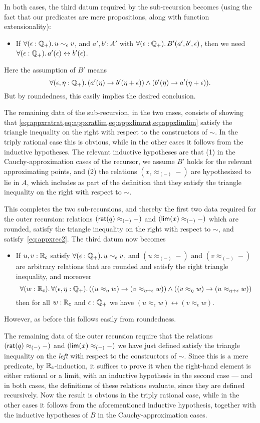 In both cases, the third datum required by the sub-recursion becomes (using the fact that our predicates are mere propositions, along with function extensionality):
\begin{itemize}
\item If $\fall{\epsilon:\Qp} u\sim_\epsilon v$, and $a',b':A'$ with $\fall{\epsilon:\Qp} B'(a',b',\epsilon)$, then we need $\fall{\epsilon:\Qp} a'(\epsilon) \leftrightarrow b'(\epsilon)$.
\end{itemize}
Here the assumption of $B'$ means
\[\fall{\epsilon,\eta:\Qp} (a'(\eta) \to b'(\eta+\epsilon)) \land (b'(\eta) \to a'(\eta+\epsilon)).\]
But by roundedness, this easily implies the desired conclusion.

The remaining data of the sub-recursion, in the two cases, consists of showing that \cref{eq:appxratrat,eq:appxratlim,eq:appxlimrat,eq:appxlimlim} satisfy the triangle inequality on the right with respect to the constructors of $\sim$.
In the triply rational case this is obvious, while in the other cases it follows from the inductive hypotheses.
The relevant inductive hypotheses are that (1) in the Cauchy-approximation cases of the recursor, we assume $B'$ holds for the relevant approximating points, and (2) the relations $(x_\epsilon \approx_{(-)} -)$ are hypothesized to lie in $A$, which includes as part of the definition that they satisfy the triangle inequality on the right with respect to $\sim$.

This completes the two sub-recursions, and thereby the first two data required for the outer recursion: relations $(\mathsf{rat}(q)\approx_{(-)}-)$ and $(\mathsf{lim}(x)\approx_{(-)}-)$ which are rounded, satisfy the triangle inequality on the right with respect to $\sim$, and satisfy~\eqref{eq:appxrec2}.
The third datum now becomes
\begin{itemize}
\item If $u,v:\mathbb{R}_\mathsf{c}$ satisfy $\fall{\epsilon:\Qp} u\sim_\epsilon v$, and $(u\approx_{(-)}-)$ and $(v\approx_{(-)}-)$ are arbitrary relations that are rounded and satisfy the right triangle inequality, and moreover
  \[ \fall{w:\RC}{\epsilon,\eta:\Qp} ((u\approx_\eta w) \to (v\approx_{\eta+\epsilon} w)) \land
  ((v\approx_\eta w) \to (u\approx_{\eta+\epsilon} w))
  \]
  then for all $w:\mathbb{R}_\mathsf{c}$ and $\epsilon:\mathbb{Q}_{+}$ we have $(u\approx_{\epsilon} w) \leftrightarrow (v\approx_{\epsilon} w)$.
\end{itemize}
However, as before this follows easily from roundedness.

The remaining data of the outer recursion require that the relations $(\mathsf{rat}(q)\approx_{(-)}-)$ and $(\mathsf{lim}(x)\approx_{(-)}-)$ we have just defined satisfy the triangle inequality on the \emph{left} with respect to the constructors of $\sim$.
Since this is a mere predicate, by $\mathbb{R}_\mathsf{c}$-induction, it suffices to prove it when the right-hand element is either rational or a limit, with an inductive hypothesis in the second case --- and in both cases, the definitions of these relations evaluate, since they are defined recursively.
Now the result is obvious in the triply rational case, while in the other cases it follows from the aforementioned inductive hypothesis, together with the inductive hypotheses of $B$ in the Cauchy-approximation cases.

